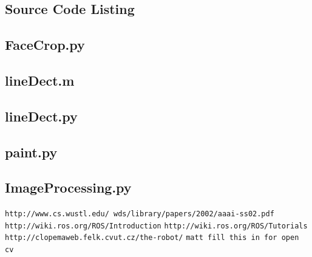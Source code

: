 \documentclass{l3proj}
\begin{document}

\clearpage
\begin{appendices}
\chapter{Source Code Listing}
\section{FaceCrop.py}

\newpage
\section{lineDect.m}

\newpage
\section{lineDect.py}

\newpage
\section{paint.py}

\newpage
\section{ImageProcessing.py}

\end{appendices}
%

\begin{thebibliography}{1}

     \texttt{http://www.cs.wustl.edu/~wds/library/papers/2002/aaai-ss02.pdf}
     \texttt{http://wiki.ros.org/ROS/Introduction}
     \texttt{http://wiki.ros.org/ROS/Tutorials}
     \texttt{http://clopemaweb.felk.cvut.cz/the-robot/}
    \texttt{matt fill this in for open cv}
\end{thebibliography}
\clearpage
\printglossaries %
\end{document}
